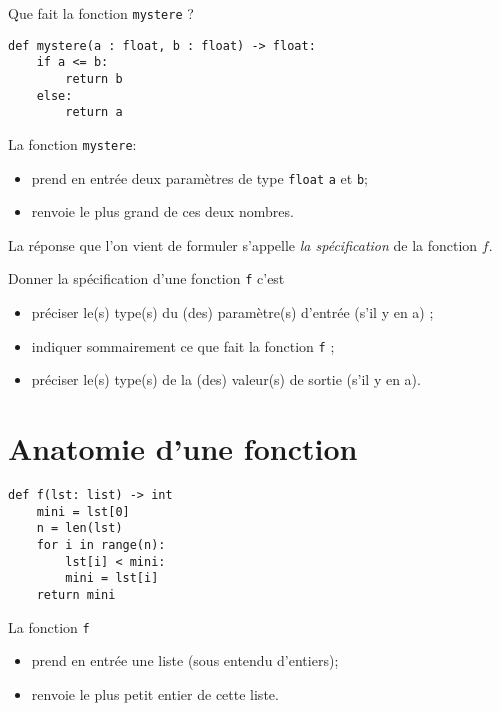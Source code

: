 Que fait la fonction \texttt{mystere} ?

\begin{verbatim}
def mystere(a : float, b : float) -> float:
    if a <= b:
        return b
    else:
        return a            
\end{verbatim}



La fonction \texttt{mystere}:
\begin{itemize}
    \item   prend en entrée deux paramètres de type \texttt{float} \texttt{a} et \texttt{b};
    \item   renvoie le plus grand de ces deux nombres.
\end{itemize}

La réponse que l'on vient de formuler s'appelle \textit{la spécification} de la fonction $f$.

\begin{definition}[ : fonction]
    Donner la spécification d'une fonction \texttt{f} c'est
    \begin{itemize}
        \item   préciser le(s) type(s) du (des) paramètre(s) d'entrée (s'il y en a) ;
        \item   indiquer sommairement ce que fait la fonction \texttt{f} ;
        \item   préciser le(s) type(s) de la (des) valeur(s) de sortie (s'il y en a).
    \end{itemize}
\end{definition}

\section{Anatomie d'une fonction}
\begin{pyc}
\begin{verbatim}
def f(lst: list) -> int
    mini = lst[0]
    n = len(lst)
    for i in range(n):
        lst[i] < mini:
        mini = lst[i]
    return mini
   \end{verbatim}
\end{pyc}

La fonction \texttt{f}
\begin{itemize}
    \item   prend en entrée une liste (sous entendu d'entiers);
    \item   renvoie le plus petit entier de cette liste.
\end{itemize}

